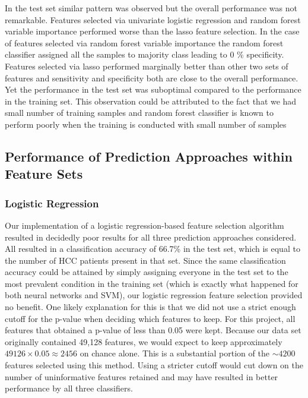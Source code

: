 \documentclass[a4paper]{article}
\begin{document}
In the test set similar pattern was observed but the overall performance was not remarkable. Features selected via univariate logistic regression and random forest variable importance performed worse than the lasso feature selection. In the case of features selected via random forest variable importance the random forest classifier assigned all the samples to majority class leading to 0 \% specificity. Features selected via lasso performed marginally better than other two sets of features and sensitivity and specificity both are close to the overall performance. Yet the performance in the test set was suboptimal compared to the performance in the training set. This observation could be attributed to the fact that we had small number of training samples and random forest classifier is known to perform poorly when the training is conducted with small number of samples

\subsection{Performance of Prediction Approaches within Feature Sets}

\subsubsection{Logistic Regression}

Our implementation of a logistic regression-based feature selection algorithm resulted in decidedly poor results for all three prediction approaches considered. All resulted in a classification accuracy of 66.7\% in the test set, which is equal to the number of HCC patients present in that set. Since the same classification accuracy could be attained by simply assigning everyone in the test set to the most prevalent condition in the training set (which is exactly what happened for both neural networks and SVM), our logistic regression feature selection provided no benefit. One likely explanation for this is that we did not use a strict enough cutoff for the p-value when deciding which features to keep. For this project, all features that obtained a p-value of less than 0.05 were kept. Because our data set originally contained 49,128 features, we would expect to keep approximately $49126 \times 0.05 \approx 2456$ on chance alone. This is a substantial portion of the $\sim 4200$ features selected using this method. Using a stricter cutoff would cut down on the number of uninformative features retained and may have resulted in better performance by all three classifiers. 
\end{document}
